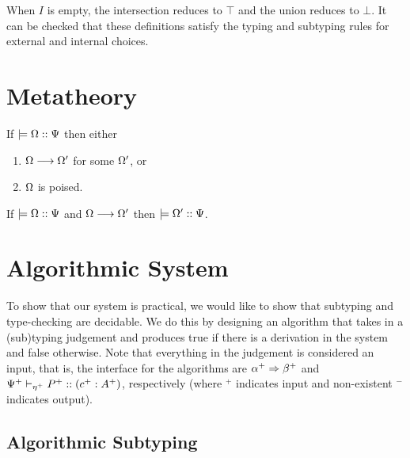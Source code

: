 \documentclass[a4paper,USenglish]{lipics-v2016}
\begin{document}
When $I$ is empty, the intersection reduces to $\top$ and the union reduces to $\bot$. It can be checked that these definitions satisfy the typing and subtyping rules for external and internal choices.



\section{Metatheory}
\label{metatheory}



\begin{theorem}[Progress]
If $\models {\Omega} :: {\Psi}$ then either
\begin{enumerate}
  \item $\Omega \longrightarrow \Omega'$ for some $\Omega'$, or
  \item $\Omega$ is poised.
\end{enumerate}
\end{theorem}


\begin{theorem}[Preservation]
If $\models {\Omega} :: {\Psi}$ and $\Omega \longrightarrow \Omega'$ then $\models {\Omega'} :: {\Psi}$.
\end{theorem}


\section{Algorithmic System}
\label{algorithmic}

To show that our system is practical, we would like to show that subtyping and type-checking are decidable. We do this by designing an algorithm that takes in a (sub)typing judgement and produces true if there is a derivation in the system and false otherwise. Note that everything in the judgement is considered an input, that is, the interface for the algorithms are $\alpha^+ \Rightarrow \beta^+$ and ${\Psi^+} \vdash_{\eta^+} P^+ :: (c^+ : A^+)$, respectively (where $^+$ indicates input and non-existent $^-$ indicates output). 


\subsection{Algorithmic Subtyping}
\end{document}
